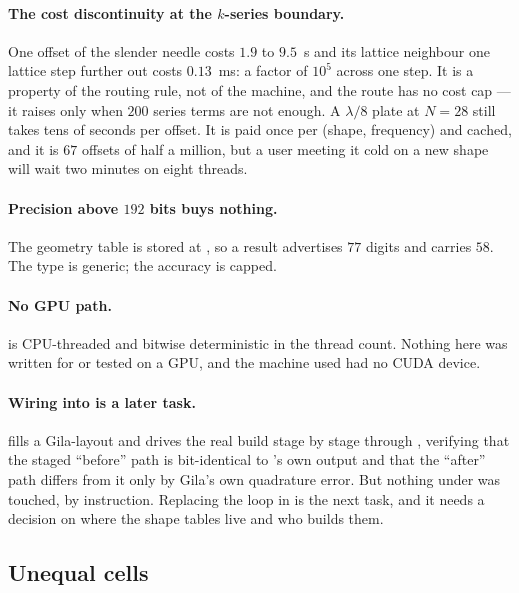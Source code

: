 \paragraph{The cost discontinuity at the $k$-series boundary.} One offset of the slender
needle costs $1.9$ to $9.5$~s and its lattice neighbour one lattice step further out costs
$0.13$~ms: a factor of $10^{5}$ across one step. It is a property of the routing rule, not of
the machine, and the route has no cost cap --- it raises only when $200$ series terms are
not enough. A $\lambda/8$ plate at $N = 28$ still takes tens of seconds per offset. It is
paid once per (shape, frequency) and cached, and it is $67$ offsets of half a million, but a
user meeting it cold on a new shape will wait two minutes on eight threads.

\paragraph{Precision above $192$ bits buys nothing.} The geometry table is stored at
, so a  result advertises $77$ digits and carries
$58$. The type is generic; the accuracy is capped.

\paragraph{No GPU path.}  is CPU-threaded and bitwise deterministic in the
thread count. Nothing here was written for or tested on a GPU, and the machine used had no
CUDA device.

\paragraph{Wiring into  is a later task.}  fills a
Gila-layout  and  drives the real build stage by stage through
, verifying that the staged ``before'' path is
bit-identical to 's own output and that the ``after'' path differs from it
only by Gila's own quadrature error. But nothing under  was touched, by
instruction. Replacing the  loop in  is the next task,
and it needs a decision on where the shape tables live and who builds them.

\subsection{Unequal cells}

